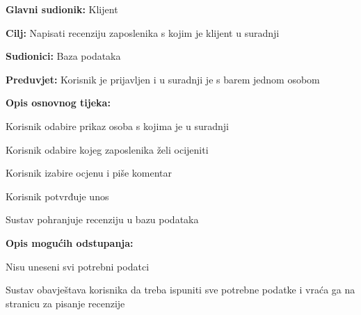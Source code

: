 					\noindent {}
					\begin{packed_item}
						
						\item \textbf{Glavni sudionik:} Klijent
						\item  \textbf{Cilj:} Napisati recenziju zaposlenika s kojim je klijent u suradnji
						\item  \textbf{Sudionici:} Baza podataka
						\item  \textbf{Preduvjet:} Korisnik je prijavljen i u suradnji je s barem jednom osobom
						\item  \textbf{Opis osnovnog tijeka:}
						
						\item[] \begin{packed_enum}
							
							\item Korisnik odabire prikaz osoba s kojima je u suradnji
							\item Korisnik odabire kojeg zaposlenika želi ocijeniti
							\item Korisnik izabire ocjenu i piše komentar
							\item Korisnik potvrđuje unos
							\item Sustav pohranjuje recenziju u bazu podataka
							
						\end{packed_enum}
					
						\item  \textbf{Opis mogućih odstupanja:}
						
						\item[] \begin{packed_item}
							
							\item[4.a] Nisu uneseni svi potrebni podatci
							\item[] \begin{packed_enum}
								
								\item Sustav obavještava korisnika da treba ispuniti sve potrebne podatke i vraća ga na stranicu za pisanje recenzije
								
							\end{packed_enum}
							
						\end{packed_item}
						
						
					\end{packed_item}
			
